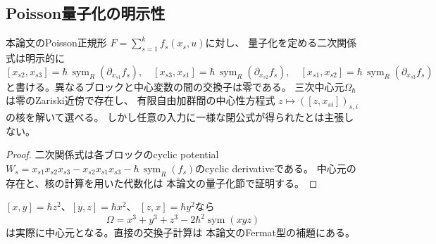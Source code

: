 \subsection{Poisson量子化の明示性}
\begin{proposition}\label{prop:poisson-quantization-explicit}
本論文のPoisson正規形
$F=\sum_{s=1}^k f_s(x_s,u)$に対し、
量子化を定める二次関係式は明示的に
\[
 [x_{s2},x_{s3}]
 =\hbar\,\operatorname{sym}_R(\partial_{x_{s1}}f_s),
 \quad
 [x_{s3},x_{s1}]
 =\hbar\,\operatorname{sym}_R(\partial_{x_{s2}}f_s),
 \quad
 [x_{s1},x_{s2}]
 =\hbar\,\operatorname{sym}_R(\partial_{x_{s3}}f_s)
\]
と書ける。異なるブロックと中心変数の間の交換子は零である。
三次中心元$\Omega_\hbar$は零のZariski近傍で存在し、
有限自由加群間の中心性方程式
$z\mapsto([z,x_{si}])_{s,i}$の核を解いて選べる。
しかし任意の入力に一様な閉公式が得られたとは主張しない。
\end{proposition}
\begin{proof}
二次関係式は各ブロックのcyclic potential
$W_s=x_{s1}x_{s2}x_{s3}-x_{s2}x_{s1}x_{s3}
-\hbar\,\operatorname{sym}_R(f_s)$のcyclic derivativeである。
中心元の存在と、核の計算を用いた代数化は
本論文の量子化節で証明する。
\end{proof}
\begin{example}[Fermat型]
$[x,y]=\hbar z^2$、$[y,z]=\hbar x^2$、
$[z,x]=\hbar y^2$なら
\[
 \Omega=x^3+y^3+z^3
      -2\hbar^2\operatorname{sym}(xyz)
\]
は実際に中心元となる。直接の交換子計算は
本論文のFermat型の補題にある。
\end{example}
